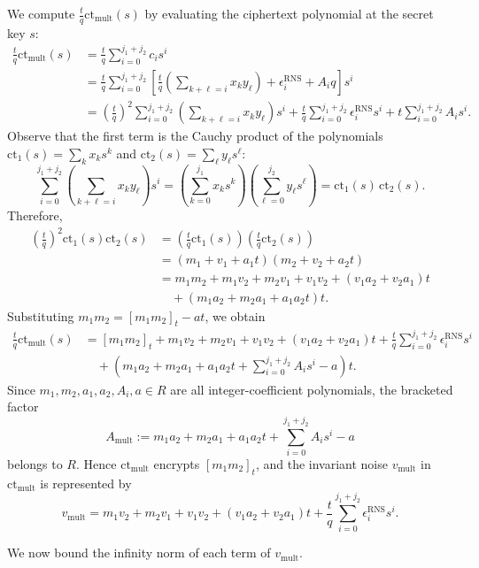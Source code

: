 \documentclass[11pt]{article}
\newcommand{\ct}{\mathrm{ct}}
\newcommand{\ctmult}{\mathrm{ct}_{\mathrm{mult}}}
\newcommand{\vmult}{v_{\mathrm{mult}}}
\theoremstyle{plain}
\theoremstyle{definition}
\theoremstyle{remark}
\begin{document}
We compute $\frac{t}{q}\ctmult(s)$ by evaluating the ciphertext polynomial at the secret key $s$:
\begin{align*}
\frac{t}{q}\ctmult(s)
&=\frac{t}{q}\sum_{i=0}^{j_1+j_2}c_is^i\\
&=\frac{t}{q}\sum_{i=0}^{j_1+j_2}\left[
 \frac{t}{q}\left(\sum_{k+\ell=i}x_ky_\ell\right) + \epsilon_i^{\mathrm{RNS}} + A_iq
\right]s^i\\
&=\left(\frac{t}{q}\right)^2\sum_{i=0}^{j_1+j_2}\left(\sum_{k+\ell=i}x_ky_\ell\right)s^i
  +\frac{t}{q}\sum_{i=0}^{j_1+j_2}\epsilon_i^{\mathrm{RNS}}s^i
  +t\sum_{i=0}^{j_1+j_2}A_is^i .
\end{align*}
Observe that the first term is the Cauchy product of the polynomials $\ct_1(s)=\sum_kx_ks^k$ and $\ct_2(s)=\sum_\ell y_\ell s^\ell$:
\[
 \sum_{i=0}^{j_1+j_2}\left(\sum_{k+\ell=i}x_ky_\ell\right)s^i
 = \left(\sum_{k=0}^{j_1}x_ks^k\right)\left(\sum_{\ell=0}^{j_2}y_\ell s^\ell\right)
 = \ct_1(s)\,\ct_2(s).
\]
Therefore,
\begin{align*}
\left(\frac{t}{q}\right)^2\ct_1(s)\ct_2(s)
&= \left(\frac{t}{q}\ct_1(s)\right)\left(\frac{t}{q}\ct_2(s)\right)\\
&= (m_1+v_1+a_1t)(m_2+v_2+a_2t)\\
&= m_1m_2 + m_1v_2 + m_2v_1 + v_1v_2 + (v_1a_2+v_2a_1)t\\
&\quad + (m_1a_2+m_2a_1+a_1a_2t)t.
\end{align*}
Substituting $m_1m_2 = [m_1m_2]_t - at$, we obtain
\begin{align*}
\frac{t}{q}\ctmult(s)
&= [m_1m_2]_t + m_1v_2 + m_2v_1 + v_1v_2 + (v_1a_2+v_2a_1)t
   + \frac{t}{q}\sum_{i=0}^{j_1+j_2}\epsilon_i^{\mathrm{RNS}}s^i\\
&\quad + \left( m_1a_2+m_2a_1+a_1a_2t + \sum_{i=0}^{j_1+j_2}A_is^i - a \right)t .
\end{align*}
Since $m_1, m_2, a_1, a_2, A_i, a\in R$ are all integer-coefficient polynomials, the bracketed factor
\[
 A_{\mathrm{mult}} := m_1a_2+m_2a_1+a_1a_2t + \sum_{i=0}^{j_1+j_2}A_is^i - a
\]
belongs to $R$. Hence $\ctmult$ encrypts $[m_1m_2]_t$, and the invariant noise $\vmult$ in $\ctmult$ is
represented by
\begin{equation}
 \vmult = m_1v_2 + m_2v_1 + v_1v_2 + (v_1a_2+v_2a_1)t + \frac{t}{q}\sum_{i=0}^{j_1+j_2}\epsilon_i^{\mathrm{RNS}}s^i .
 \label{eq:vmult-exact}
\end{equation}

We now bound the infinity norm of each term of $\vmult$.
\end{document}
